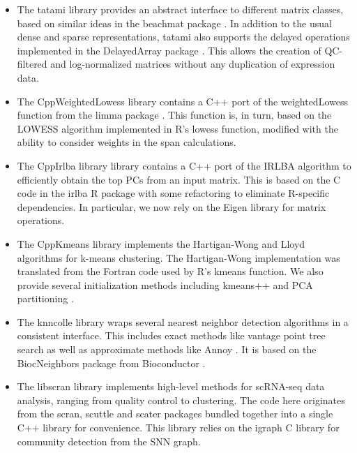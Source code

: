 \documentclass{article}
\begin{document}
\begin{itemize}
\item The tatami library \cite{tatami} provides an abstract interface to different matrix classes, 
based on similar ideas in the beachmat package \cite{lun2018beachmat}. 
In addition to the usual dense and sparse representations, tatami also supports the delayed operations implemented in the DelayedArray package \cite{delayedarray}.
This allows the creation of QC-filtered and log-normalized matrices without any duplication of expression data.
\item The CppWeightedLowess library \cite{cppweightedlowess} contains a C++ port of the weightedLowess function from the limma package \cite{ritchie2015limma}.
This function is, in turn, based on the LOWESS algorithm \cite{cleveland1979robust} implemented in R's lowess function, 
modified with the ability to consider weights in the span calculations.
\item The CppIrlba library \cite{cppirlba} library contains a C++ port of the IRLBA algorithm \cite{baglama2005augmented} to efficiently obtain the top PCs from an input matrix.
This is based on the C code in the irlba R package \cite{irlba} with some refactoring to eliminate R-specific dependencies.
In particular, we now rely on the Eigen library \cite{eigenweb} for matrix operations.
\item The CppKmeans library \cite{cppkmeans} implements the Hartigan-Wong \cite{hartiganwong} and Lloyd algorithms \cite{lloyd} for k-means clustering.
The Hartigan-Wong implementation was translated from the Fortran code used by R's kmeans function.
We also provide several initialization methods including kmeans++ \cite{vassilvitskii2006kmeanspp} and PCA partitioning \cite{su2007search}.
\item The knncolle library \cite{knncolle} wraps several nearest neighbor detection algorithms in a consistent interface. 
This includes exact methods like vantage point tree search \cite{yianilos1993data} as well as approximate methods like Annoy \cite{annoy}.
It is based on the BiocNeighbors package from Bioconductor \cite{biocneighbors}.
\item The libscran library \cite{libscran} implements high-level methods for scRNA-seq data analysis, ranging from quality control to clustering.
The code here originates from the scran, scuttle and scater packages \cite{lun2016step,lun2017scater} bundled together into a single C++ library for convenience. 
This library relies on the igraph C library \cite{csardi2006igraph} for community detection from the SNN graph.

\end{itemize}
\end{document}
